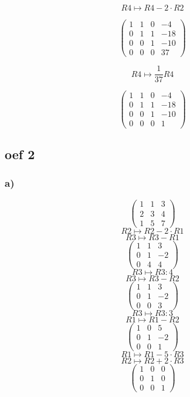 \documentclass[10pt,a4paper]{article}
\begin{document}
$$R4 \longmapsto R4 - 2\cdot R2$$

$$
\begin{pmatrix}
1 & 1 & 0 & -4\\
0 & 1 & 1 & -18\\
0 & 0 & 1 & -10\\
0 & 0 & 0 & 37
\end{pmatrix}
$$

$$R4 \longmapsto \frac{1}{37} R4$$

$$
\begin{pmatrix}
1 & 1 & 0 & -4\\
0 & 1 & 1 & -18\\
0 & 0 & 1 & -10\\
0 & 0 & 0 & 1
\end{pmatrix}
$$
\subsection*{oef 2}
\subsubsection*{a)}
\[
\begin{pmatrix}
1 &  1 &  3\\
2 &  3 &  4\\
1 &  5 &  7
\end{pmatrix}
\]
\[ R2 \longmapsto R2 -2\cdot R1\]
\[ R3 \longmapsto R3 - R1\]
\[
\begin{pmatrix}
1 &  1 &  3\\
0 &  1 &  -2\\
0 &  4 &  4
\end{pmatrix}
\]
\[ R3 \longmapsto R3:4\]
\[ R3 \longmapsto R3 - R2\]
\[
\begin{pmatrix}
1 &  1 &  3\\
0 &  1 &  -2\\
0 &  0 &  3
\end{pmatrix}
\]
\[ R3 \longmapsto R3:3\]
\[ R1 \longmapsto R1 - R2\]
\[
\begin{pmatrix}
1 &  0 &  5\\
0 &  1 &  -2\\
0 &  0 &  1
\end{pmatrix}
\]
\[ R1 \longmapsto R1 -5\cdot R3\]
\[ R2 \longmapsto R2 +2\cdot R3\]
\[
\begin{pmatrix}
1 &  0 &  0\\
0 &  1 &  0\\
0 &  0 &  1
\end{pmatrix}
\]
\end{document}
